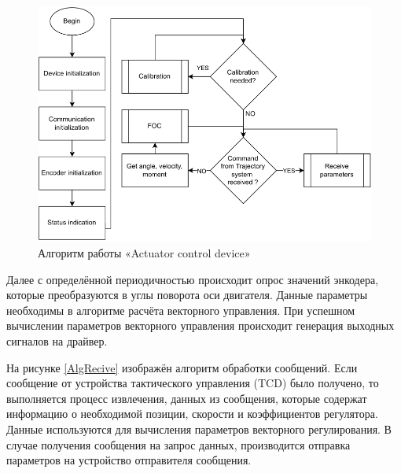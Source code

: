 \begin{figure}[H]
	\centering
	\includegraphics[width=\textwidth]{Src/images/acdalg.png}
	\caption{Алгоритм работы «Actuator control device»}
	\label{AlgACD}
\end{figure}

Далее с определённой периодичностью происходит опрос значений энкодера, которые преобразуются в углы поворота оси двигателя. Данные параметры необходимы в алгоритме расчёта векторного управления. При успешном вычислении параметров векторного управления происходит генерация выходных сигналов на драйвер.

На рисунке \ref{AlgRecive} изображён алгоритм обработки сообщений. Если сообщение от устройства тактического управления (TCD) было получено, то выполняется процесс извлечения, данных из сообщения, которые содержат информацию о необходимой позиции, скорости и коэффициентов регулятора. Данные используются для вычисления параметров векторного регулирования. В случае получения сообщения на запрос данных, производится отправка параметров на устройство отправителя сообщения.

